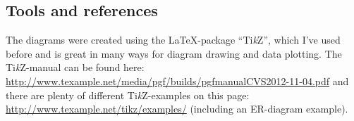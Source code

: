 \documentclass[12pt, a4paper,titlepage]{article}
\begin{document}
\subsection{Tools and references}
The diagrams were created using the \LaTeX-package
``Ti\emph{k}Z'', which I've used before and is great in many ways for diagram
drawing and data plotting. The Ti\emph{k}Z-manual can be found here:
\url{http://www.texample.net/media/pgf/builds/pgfmanualCVS2012-11-04.pdf}
and there are plenty of different Ti\emph{k}Z-examples on this page:
\url{http://www.texample.net/tikz/examples/} (including an ER-diagram example).
\end{document}
